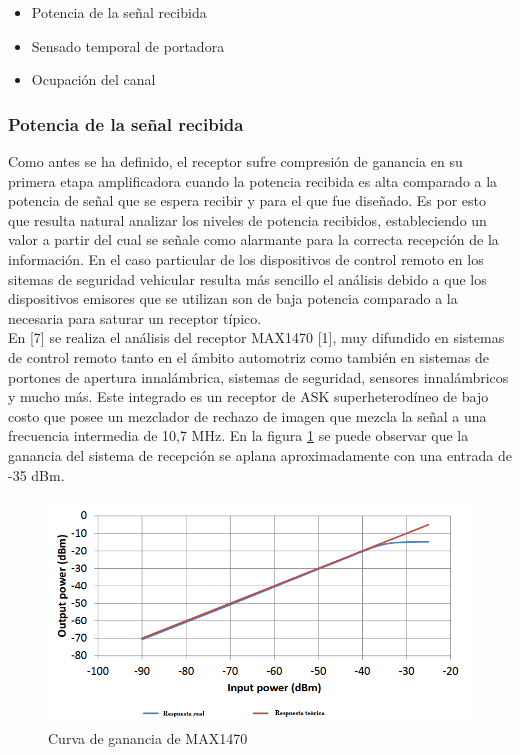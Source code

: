 \documentclass[12pt]{report}
\begin{document}
\begin{itemize}
    \item Potencia de la señal recibida
    \item Sensado temporal de portadora
    \item Ocupación del canal

\end{itemize}

\subsubsection{Potencia de la señal recibida}

Como antes se ha definido, el receptor sufre compresión de ganancia en su primera etapa amplificadora cuando la potencia recibida es alta
comparado a la potencia de señal que se espera recibir y para el que fue diseñado. Es por esto que resulta natural analizar los niveles de
potencia recibidos, estableciendo un valor a partir del cual se señale como alarmante para la correcta recepción de la información. 
En el caso particular de los dispositivos de control remoto en los sitemas de seguridad vehicular resulta más sencillo el análisis 
debido a que los dispositivos emisores que se utilizan son de baja potencia comparado a la necesaria para saturar un receptor típico.\\
En [7] se realiza el análisis del receptor MAX1470 [1], muy difundido en sistemas de control remoto tanto en el ámbito automotriz como también
en sistemas de portones de apertura innalámbrica, sistemas de seguridad, sensores innalámbricos y mucho más. Este integrado es un receptor de 
ASK superheterodíneo de bajo costo que posee un mezclador de rechazo de imagen que mezcla la señal a una frecuencia intermedia de 10,7 MHz. En
la figura \ref{compresion_max} se puede observar que la ganancia del sistema de recepción se aplana aproximadamente con una entrada de -35 dBm.

\begin{figure}[htb]
	\centering
	\includegraphics[scale=0.5]{compresion_max.png}
    \caption{Curva de ganancia de MAX1470}
	\label{compresion_max}
\end{figure}
\end{document}
